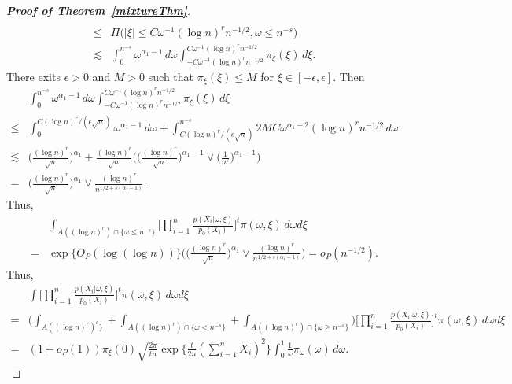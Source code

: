 \documentclass[11pt]{article}
\theoremstyle{plain}
\theoremstyle{definition}
\theoremstyle{remark}
\begin{document}
\begin{appendices}
\begin{proof}[\textbf{Proof of Theorem~\ref{mixtureThm}}]
\begin{align*}
    \\
    \leq
    &\Pi\big(|\xi|\leq C \omega^{-1} (\log n)^r n^{-1/2},\omega\leq n^{-s}\big)
    \\
    \lesssim &
    \int_{0}^{n^{-s}} \omega^{\alpha_1-1}\, d\omega
    \int_{-C \omega^{-1} (\log n)^r n^{-1/2}}^{C \omega^{-1} (\log n)^r n^{-1/2}} \pi_{\xi}(\xi) \, d\xi.
\end{align*}
There exits $\epsilon>0$ and $M>0$ such that $\pi_{\xi}(\xi)\leq M$ for $\xi\in [-\epsilon,\epsilon]$. Then
\begin{align*}
    &\int_{0}^{n^{-s}} \omega^{\alpha_1-1}\, d\omega
    \int_{-C \omega^{-1} (\log n)^r n^{-1/2}}^{C \omega^{-1} (\log n)^r n^{-1/2}} \pi_{\xi}(\xi) \, d\xi
    \\
    \leq &
    \int_{0}^{{C(\log n)^r}/{(\epsilon \sqrt{n})}} \omega^{\alpha_1-1}\, d\omega
    +
    \int_{{C(\log n)^r}/{(\epsilon \sqrt{n})}}^{n^{-s}} 
    2MC \omega^{\alpha_1-2}(\log n)^r n^{-1/2}
    \, d\omega
    \\
    \lesssim &
     \Big(\frac{(\log n)^r}{\sqrt{n}}\Big)^{\alpha_1}
     +\frac{(\log n)^r}{\sqrt{n}}\Bigg(\Big(\frac{(\log n)^r}{\sqrt{n}}\Big)^{\alpha_1-1}\vee \Big(\frac{1}{n^{s}}\Big)^{\alpha_1-1}\Bigg)
     \\
    = &
    \Big(\frac{(\log n)^r}{\sqrt{n}}\Big)^{\alpha_1}\vee \frac{(\log n)^r}{n^{1/2+s(\alpha_1-1)}}.
\end{align*}
Thus,
\begin{align*}
    & \int_{A( (\log n)^r )\cap \{\omega\leq n^{-s}\}} \Big[\prod_{i=1}^n \frac{p(X_i|\omega,\xi)}{p_0(X_i)}\Big]^t \pi(\omega,\xi)\, d\omega d\xi
    \\
    =&\exp\big\{O_P(\log(\log n))\big\}
    \Bigg(\Big(\frac{(\log n)^r}{\sqrt{n}}\Big)^{\alpha_1}\vee \frac{(\log n)^r}{n^{1/2+s(\alpha_1-1)}}\Bigg)=o_P(n^{-1/2}).
\end{align*}
Thus,
\begin{align*}
    & \int \Big[\prod_{i=1}^n \frac{p(X_i|\omega,\xi)}{p_0(X_i)}\Big]^t \pi(\omega,\xi)\, d\omega d\xi
    \\
    =& \bigg( \int_{A( (\log n)^r )^c\}}+\int_{A( (\log n)^r )\cap \{\omega< n^{-s}\}}+\int_{A( (\log n)^r )\cap \{\omega\geq n^{-s}\}}\bigg) \Big[\prod_{i=1}^n \frac{p(X_i|\omega,\xi)}{p_0(X_i)}\Big]^t \pi(\omega,\xi)\, d\omega d\xi
    \\
    =&
(1+o_P(1))\pi_{\xi}(0)\sqrt{\frac{2\pi}{tn}}\exp \Big\{ \frac{t}{2n}(\sum_{i=1}^n X_i)^2\Big\} 
\int_{0}^1 
\frac{1}{\omega}
\pi_{\omega}(\omega)\, d\omega.
\end{align*}


\end{proof}
\end{appendices}
\end{document}
